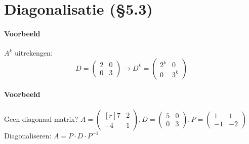 \section{Diagonalisatie (\S5.3)}
\paragraph{Voorbeeld} $A^k$ uitrekengen:
\[D = \begin{pmatrix} 2 & 0 \\ 0 & 3 \end{pmatrix} \to D^k = \begin{pmatrix} 2^k & 0 \\ 0 & 3^k \end{pmatrix} \]

\paragraph{Voorbeeld} Geen diagonaal matrix? $A = \begin{pmatrix*}[r] 7 & 2 \\ -4 & 1 \end{pmatrix*}, D = \begin{pmatrix} 5 & 0 \\ 0 & 3 \end{pmatrix}, P = \begin{pmatrix*} 1 & 1 \\ -1 & -2 \end{pmatrix*}$
Diagonaliseren: $A = P \cdot D \cdot P^{-1}$
